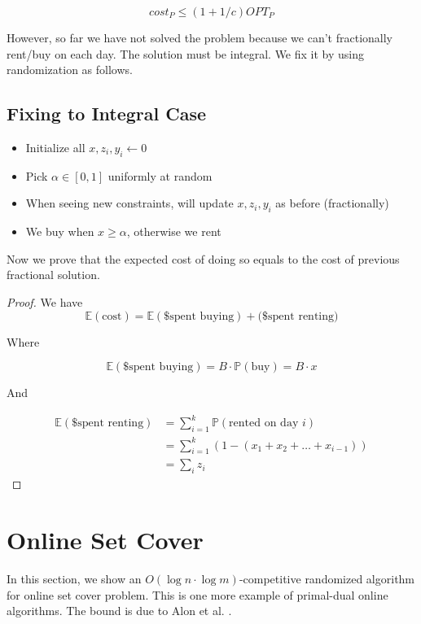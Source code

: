 \documentclass[11pt]{article}
\begin{document}
$$cost_P\le (1+1/c)OPT_P$$

However, so far we have not solved the problem because we can't fractionally rent/buy on each day. The solution must be integral. We fix it by using randomization as follows.

\subsection{Fixing to Integral Case}

\begin{itemize}
\item Initialize all $x, z_i, y_i\gets 0$

\item Pick $\alpha \in [0,1]$ uniformly at random

\item When seeing new constraints, will update $x, z_i, y_i$ as before (fractionally)

\item We buy when $x \ge \alpha$, otherwise we rent
\end{itemize}

Now we prove that the expected cost of doing so equals to the cost of previous fractional solution. 
\begin{proof} 
We have 
$$\mathbb{E}(\text{cost}) = \mathbb{E}(\$\text{spent buying})+\mathbb(\$\text{spent renting})$$

Where 

$$\mathbb{E}(\$\text{spent buying})=B\cdot \mathbb{P}(\text{buy})=B\cdot x$$

And 

\begin{equation}
\begin{split}
\mathbb{E}(\$\text{spent renting}) &=\sum_{i=1}^{k}{\mathbb{P}(\text{rented on day }i)} \\
&= \sum_{i=1}^{k}{(1-(x_1+x_2+\ldots+x_{i-1}))} \\
&= \sum_i{z_i}
\end{split}
\end{equation}
\end{proof}

\section{Online Set Cover} \label{section:set_cover}

In this section, we show an $O(\log n \cdot \log m)$-competitive randomized algorithm for online set cover problem.  This is one more example of primal-dual online algorithms. The bound is due to Alon et al. \cite{alon2009online}. 
\end{document}
